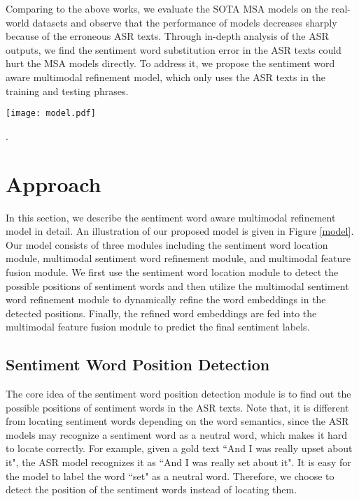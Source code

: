 \documentclass[11pt]{article}
\begin{document}
Comparing to the above works, we evaluate the SOTA MSA models on the real-world datasets and observe that the performance of models decreases sharply because of the erroneous ASR texts. Through in-depth analysis of the ASR outputs, we find the sentiment word substitution error in the ASR texts could hurt the MSA models directly. To address it, we propose the sentiment word aware multimodal refinement model, which only uses the ASR texts in the training and testing phrases.




\begin{figure*}[t]
\centering
\texttt{[image: model.pdf]} %
\caption{Illustration of our proposed model.}.
\label{model}
\end{figure*}



\section{Approach}

In this section, we describe the sentiment word aware multimodal refinement model in detail. An illustration of our proposed model is given in Figure \ref{model}. Our model consists of three modules including the sentiment word location module, multimodal sentiment word refinement module, and multimodal feature fusion module. We first use the sentiment word location module to detect the possible positions of sentiment words and then utilize the multimodal sentiment word refinement module to dynamically refine the word embeddings in the detected positions. Finally, the refined word embeddings are fed into the multimodal feature fusion module to predict the final sentiment labels. 


\subsection{Sentiment Word Position Detection}
The core idea of the sentiment word position detection module is to find out the possible positions of sentiment words in the ASR texts. Note that, it is different from locating sentiment words depending on the word semantics, since the ASR models may recognize a sentiment word as a neutral word, which makes it hard to locate correctly. For example, given a gold text ``And I was really upset about it", the ASR model recognizes it as ``And I was really set about it". It is easy for the model to label the word ``set" as a neutral word. Therefore, we choose to detect the position of the sentiment words instead of locating them. 
\end{document}
